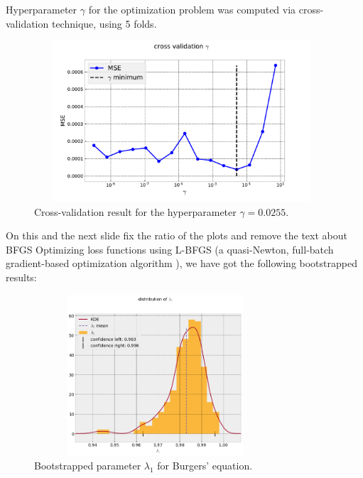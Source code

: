 \documentclass{beamer}
\begin{document}
\begin{frame}

Hyperparameter $\gamma$ for the optimization problem was computed via cross-validation technique, using 5 folds. 
\begin{figure}
    \centering
    \includegraphics[width=11cm, height=6cm]{images/cross_val_gamma.pdf}
    \caption{Cross-validation result for the hyperparameter $\gamma = 0.0255$.}
    \label{fig:cross_val_gamma}
\end{figure}
    
\end{frame}

\begin{frame}{}

{\color{red}On this and the next slide fix the ratio of the plots and remove
the text about BFGS}
Optimizing loss functions using L-BFGS (a quasi-Newton, full-batch gradient-based optimization algorithm \cite{Liu1989Nocedal}), we have got the following bootstrapped results:
\begin{figure}
\centering
\includegraphics[width = 9cm , height = 6cm]{images/bootstraped_l1.png}
\caption{Bootstrapped parameter $\lambda_1$ for Burgers' equation.}
\end{figure}

\end{frame}
\end{document}
